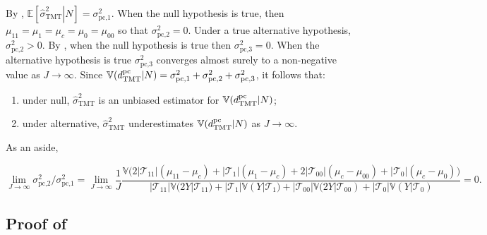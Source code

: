 \documentclass[12pt]{extarticle}
\newcommand{\E}{\mathbb{E}}
\newcommand{\nind}{J}
\newcommand{\tmt}{{\normalfont \text{TMT}}}
\newcommand{\dtmtpc}{d_{\tmt}^{\normalfont \text{pc}}}
\newcommand{\vir}{\sigma^2_{\text{pc,1}}}
\newcommand{\virb}{\sigma^2_{\text{pc,2}}}
\newcommand{\virc}{\sigma^2_{\text{pc,3}}}
\newcommand{\vtmthat}{\hat{\sigma}^2_{\text{TMT}}}
\newcommand{\V}{\mathbb{V}}
\newcommand{\cT}{\mathcal{T}}
\begin{document}
{{By , $\E\left[ \left. \vtmthat \right| N \right] = \vir$. When the null hypothesis is true, then $\mu_{11}=\mu_1=\mu_c=\mu_0=\mu_{00}$ so that $\virb=0$. Under a true alternative hypothesis, $\virb>0$. By , when the null hypothesis is true then $\virc=0$.  When the alternative hypothesis is true $\virc$ converges almost surely to a non-negative value as $\nind \rightarrow \infty$. Since $\V(\dtmtpc|N)=\vir+\virb+\virc$, it follows that: \begin{enumerate}
\item[(A)] under null, {\normalfont $\vtmthat$} is an unbiased estimator for {\normalfont $\V(\dtmtpc|N)$}; 
\item[(B)] under alternative, {\normalfont $\vtmthat$} underestimates {\normalfont $\V(\dtmtpc|N)$} as $\nind \to \infty$. \end{enumerate}

\noindent As an aside, 

\begin{equation*}
\lim_{\nind \to \infty}{\virb}/{\vir} = \lim_{\nind \to \infty}\frac{1}{\nind} \frac{\V\big(2|\cT_{11}|(\mu_{11}-\mu_c) + |\cT_{1}|(\mu_1-\mu_c) + 2|\cT_{00}|(\mu_{c}-\mu_{00}) + |\cT_{0}|(\mu_c-\mu_0) \big)}{|\cT_{11}|\V(2Y|\cT_{11}) + |\cT_{1}|\V(Y|\cT_1) + |\cT_{00}|\V(2Y|\cT_{00}) + |\cT_{0}|\V(Y|\cT_0)} = 0.
\end{equation*}

\subsection{Proof of } \label{app:vdtmt_converge}

}}
\end{document}
